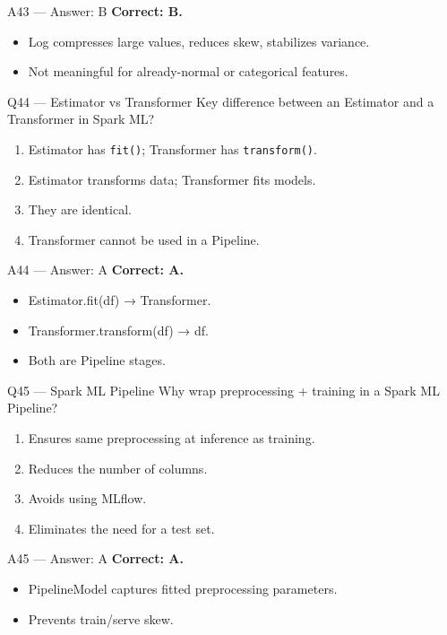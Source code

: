 \documentclass[aspectratio=169,10pt]{beamer}
\begin{document}
	\begin{frame}{A43 — Answer: B}
		\textbf{Correct: B.}
		\begin{itemize}
			\item Log compresses large values, reduces skew, stabilizes variance.
			\item Not meaningful for already-normal or categorical features.
		\end{itemize}
	\end{frame}
	
	\begin{frame}{Q44 — Estimator vs Transformer}
		Key difference between an Estimator and a Transformer in Spark ML?
		\begin{enumerate}[label=\Alph*.]
			\item Estimator has \texttt{fit()}; Transformer has \texttt{transform()}.
			\item Estimator transforms data; Transformer fits models.
			\item They are identical.
			\item Transformer cannot be used in a Pipeline.
		\end{enumerate}
	\end{frame}
	
	\begin{frame}{A44 — Answer: A}
		\textbf{Correct: A.}
		\begin{itemize}
			\item Estimator.fit(df) → Transformer.
			\item Transformer.transform(df) → df.
			\item Both are Pipeline stages.
		\end{itemize}
	\end{frame}
	
	\begin{frame}{Q45 — Spark ML Pipeline}
		Why wrap preprocessing + training in a Spark ML Pipeline?
		\begin{enumerate}[label=\Alph*.]
			\item Ensures same preprocessing at inference as training.
			\item Reduces the number of columns.
			\item Avoids using MLflow.
			\item Eliminates the need for a test set.
		\end{enumerate}
	\end{frame}
	
	\begin{frame}{A45 — Answer: A}
		\textbf{Correct: A.}
		\begin{itemize}
			\item PipelineModel captures fitted preprocessing parameters.
			\item Prevents train/serve skew.
		\end{itemize}
	\end{frame}
	
\end{document}
